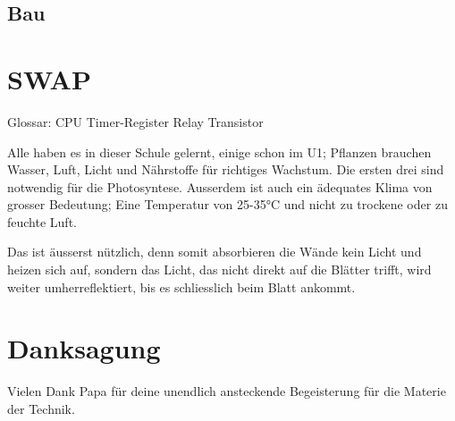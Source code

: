 \documentclass[12pt,titlepage,a4paper]{article}
\begin{document}
\subsection{Bau}

















\newpage


\section{SWAP}


Glossar:
CPU
Timer-Register
Relay
Transistor





Alle haben es in dieser Schule gelernt, einige schon im U1; Pflanzen brauchen Wasser, Luft, Licht und Nährstoffe für richtiges Wachstum. Die ersten drei sind notwendig für die Photosyntese. Ausserdem ist auch ein ädequates Klima von grosser Bedeutung; Eine Temperatur von 25-35°C und nicht zu trockene oder zu feuchte Luft.


Das ist äusserst nützlich, denn somit absorbieren die Wände kein Licht und heizen sich auf, sondern das Licht, das nicht direkt auf die Blätter trifft, wird weiter umherreflektiert, bis es schliesslich beim Blatt ankommt. 

\section{Danksagung}
Vielen Dank Papa für deine unendlich ansteckende Begeisterung für die Materie der Technik.

%

\end{document}
